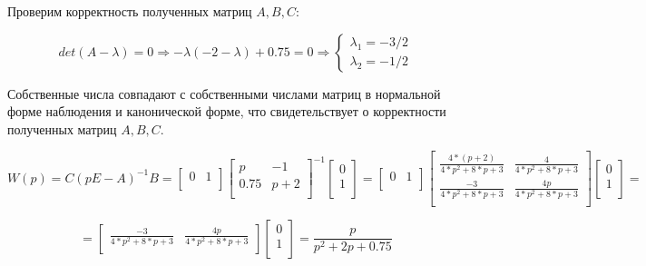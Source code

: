 \documentclass[14pt,a4paper,report]{report}
\begin{document}
Проверим корректность полученных матриц $A, B, C$:

\begin{equation*}
\text{$det(A-\lambda)=0$}
\Longrightarrow
\text{$-\lambda(-2-\lambda) + 0.75=0$}
\Longrightarrow
\begin{cases}
	\text{$\lambda_1=-3/2$} \\
	\text{$\lambda_2=-1/2$}
\end{cases}
\end{equation*}

Собственные числа совпадают с собственными числами матриц в нормальной форме наблюдения и канонической форме, что свидетельствует о корректности полученных матриц  $A, B, C$.

\begin{equation*}
\text{$W(p)=C(pE-A)^{-1}B=
\begin{bmatrix}
0 & 1 \\
\end{bmatrix}
\begin{bmatrix}
p & -1 \\
0.75 & p+2\\
\end{bmatrix}^{-1}
\begin{bmatrix}
0 \\
1 \\
\end{bmatrix}=
\begin{bmatrix}
0 & 1 \\
\end{bmatrix}
\begin{bmatrix}
\frac{4*(p + 2)}{4*p^2 + 8*p + 3} & \frac{4}{4*p^2 + 8*p + 3} \\
\frac{-3}{4*p^2 + 8*p + 3}& \frac{4p}{4*p^2 + 8*p + 3}\\
\end{bmatrix}
\begin{bmatrix}
0 \\
1 \\
\end{bmatrix}=
$}
\end{equation*}

\begin{equation*}
\text{$=\begin{bmatrix}
	\frac{-3}{4*p^2 + 8*p + 3} & \frac{4p}{4*p^2 + 8*p + 3} \\
	\end{bmatrix}\begin{bmatrix}
	0 \\
	1 \\
	\end{bmatrix}=\frac{p}{p^2+2p+0.75}
	$}
\end{equation*}
\end{document}
